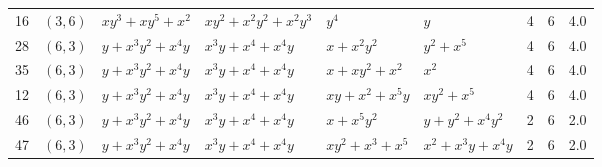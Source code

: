 \begin{table}[t]
\begin{tabular*}{\textwidth}{@{\extracolsep{\fill}}cllllllcc}
16 & $(3,6)$ & $xy^{3}{+}xy^{5}{+}x^{2}$ & $xy^{2}{+}x^{2}y^{2}{+}x^{2}y^{3}$ & $y^{4}$ & $y$ & 4 & 6 & 4.0 \\
28 & $(6,3)$ & $y{+}x^{3}y^{2}{+}x^{4}y$ & $x^{3}y{+}x^{4}{+}x^{4}y$ & $x{+}x^{2}y^{2}$ & $y^{2}{+}x^{5}$ & 4 & 6 & 4.0 \\
35 & $(6,3)$ & $y{+}x^{3}y^{2}{+}x^{4}y$ & $x^{3}y{+}x^{4}{+}x^{4}y$ & $x{+}xy^{2}{+}x^{2}$ & $x^{2}$ & 4 & 6 & 4.0 \\
12 & $(6,3)$ & $y{+}x^{3}y^{2}{+}x^{4}y$ & $x^{3}y{+}x^{4}{+}x^{4}y$ & $xy{+}x^{2}{+}x^{5}y$ & $xy^{2}{+}x^{5}$ & 4 & 6 & 4.0 \\
46 & $(6,3)$ & $y{+}x^{3}y^{2}{+}x^{4}y$ & $x^{3}y{+}x^{4}{+}x^{4}y$ & $x{+}x^{5}y^{2}$ & $y{+}y^{2}{+}x^{4}y^{2}$ & 2 & 6 & 2.0 \\
47 & $(6,3)$ & $y{+}x^{3}y^{2}{+}x^{4}y$ & $x^{3}y{+}x^{4}{+}x^{4}y$ & $xy^{2}{+}x^{3}{+}x^{5}$ & $x^{2}{+}x^{3}y{+}x^{4}y$ & 2 & 6 & 2.0 \\
\bottomrule
\end{tabular*}
\end{table}

